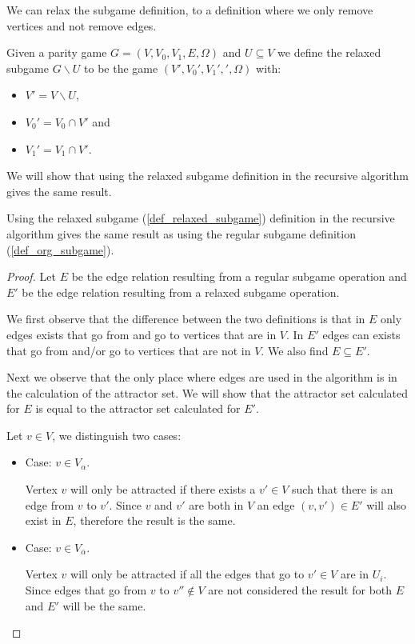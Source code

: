 We can relax the subgame definition, to a definition where we only remove vertices and not remove edges.
\begin{definition}
	\label{def_relaxed_subgame}
	Given a parity game $G = (V,V_0,V_1, E,\Omega)$ and $U \subseteq V$ we define the relaxed subgame $G \backslash U$ to be the game $(V', V_0', V_1', ', \Omega)$ with:
	\begin{itemize}
		\item $V' = V \backslash U$,
		\item $V_0' = V_0 \cap V'$ and
		\item $V_1' = V_1 \cap V'$.
	\end{itemize}
\end{definition}
We will show that using the relaxed subgame definition in the recursive algorithm gives the same result.
\begin{lemma}
	Using the relaxed subgame (\ref{def_relaxed_subgame}) definition in the recursive algorithm gives the same result as using the regular subgame definition (\ref{def_org_subgame}).
	\begin{proof}
		Let $E$ be the edge relation resulting from a regular subgame operation and $E'$ be the edge relation resulting from a relaxed subgame operation.
		
		We first observe that the difference between the two definitions is that in $E$ only edges exists that go from and go to vertices that are in $V$. In $E'$ edges can exists that go from and/or go to vertices that are not in $V$. We also find $E \subseteq E'$.
		
		Next we observe that the only place where edges are used in the algorithm is in the calculation of the attractor set. We will show that the attractor set calculated for $E$ is equal to the attractor set calculated for $E'$.
		
		Let $v \in V$, we distinguish two cases:
		\begin{itemize}
			\item Case: $v \in V_\alpha$.
			
			Vertex $v$ will only be attracted if there exists a $v' \in V$ such that there is an edge from $v$ to $v'$. Since $v$ and $v'$ are both in $V$ an edge $(v,v') \in E'$ will also exist in $E$, therefore the result is the same.
			\item Case: $v \in V_{\overline{\alpha}}$.
			
		    Vertex $v$ will only be attracted if all the edges that go to $v' \in V$ are in $U_i$. Since edges that go from $v$ to $v'' \notin V$ are not considered the result for both $E$ and $E'$ will be the same.
		\end{itemize}
	\end{proof}
\end{lemma}

